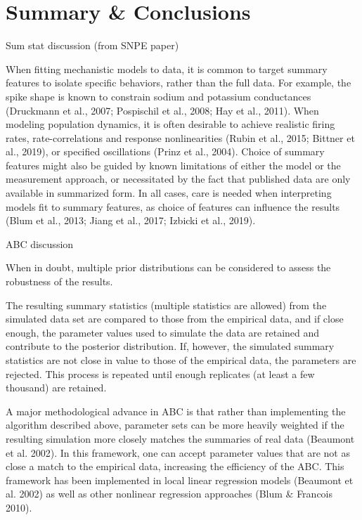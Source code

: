 \chapter{Summary \& Conclusions}\label{chap:Conclusion}

Sum stat discussion (from SNPE paper)

When fitting mechanistic models to data, it is common to target summary features to isolate specific behaviors, rather than the full data. For example, the spike shape is known to constrain sodium and potassium conductances (Druckmann et al., 2007; Pospischil et al., 2008; Hay et al., 2011). When modeling population dynamics, it is often desirable to achieve realistic firing rates, rate-correlations and response nonlinearities (Rubin et al., 2015; Bittner et al., 2019), or specified oscillations (Prinz et al., 2004). Choice of summary features might also be guided by known limitations of either the model or the measurement approach, or necessitated by the fact that published data are only available in summarized form.  In all cases, care is needed when interpreting models fit to summary features, as choice of features can influence the results (Blum et al., 2013; Jiang et al., 2017; Izbicki et al., 2019).





ABC discussion 


When in doubt, multiple prior distributions can be considered to assess the robustness of the results. 

The resulting summary statistics (multiple statistics are allowed) from the simulated data set are compared to those from the empirical data, and if close enough, the parameter values used to simulate the data are retained and contribute to the posterior distribution. If, however, the simulated summary statistics are not close in value to those of the empirical data, the parameters are rejected. This process is repeated until enough replicates (at least a few thousand) are retained. 

A major methodological advance in ABC is that rather than implementing the algorithm described above, parameter sets can be more heavily weighted if the resulting simulation more closely matches the summaries of real data (Beaumont et al. 2002). In this framework, one can accept parameter values that are not as close a match to the empirical data, increasing the efficiency of the ABC. This framework has been implemented in local linear regression models (Beaumont et al. 2002) as well as other nonlinear regression approaches (Blum \& Francois 2010). 

